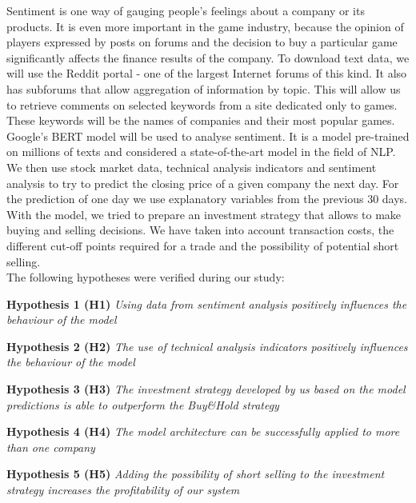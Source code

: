 \documentclass[11pt]{article} %
\begin{document}
Sentiment is one way of gauging people's feelings about a company or its products. It is even more important in the game industry, because the opinion of players expressed by posts on forums and the decision to buy a particular game  significantly affects the finance results of the company. To download text data, we will use the Reddit portal - one of the largest Internet forums of this kind. It also has subforums that allow aggregation of information by topic. This will allow us to retrieve comments on selected keywords from a site dedicated only to games. These keywords will be the names of companies and their most popular games. \\

Google's BERT model will be used to analyse sentiment. It is a model pre-trained on millions of texts and considered a state-of-the-art model in the field of NLP. 
We then use stock market data, technical analysis indicators and sentiment analysis to try to predict the closing price of a given company the next day. For the prediction of one day we use explanatory variables from the previous 30 days. With the model, we tried to prepare an investment strategy that allows to make buying and selling decisions. We have taken into account transaction costs, the different cut-off points required for a trade and the possibility of potential short selling. \\

The following hypotheses were verified during our study: 

 \begin{flushleft}\textbf{Hypothesis 1 (H1)} \textit{Using data from sentiment analysis positively influences the behaviour of the model }  \end{flushleft}
 \begin{flushleft}\textbf{Hypothesis 2 (H2)} \textit{The use of technical analysis indicators positively influences the behaviour of the model } \end{flushleft}
 \begin{flushleft}\textbf{Hypothesis 3 (H3)} \textit{The investment strategy developed by us based on the model predictions is able to outperform the Buy\&Hold strategy } \end{flushleft}
 \begin{flushleft}\textbf{Hypothesis 4 (H4)} \textit{The model architecture can be successfully applied to more than one company} \end{flushleft}
 \begin{flushleft}\textbf{Hypothesis 5 (H5)} \textit{Adding the possibility of short selling to the investment strategy increases the profitability of our system} \end{flushleft}
\end{document}
